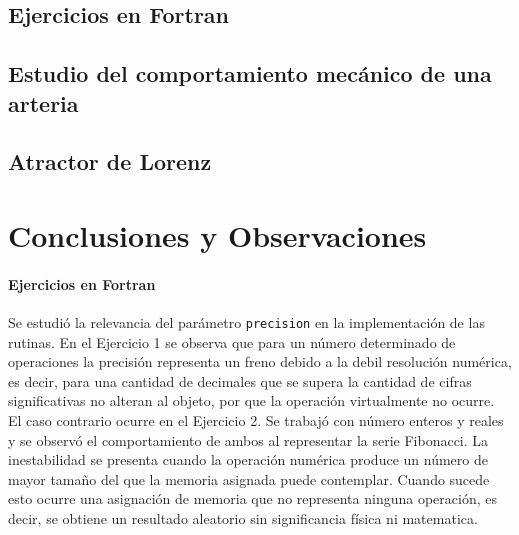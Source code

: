 \documentclass[letterpaper]{article}
\begin{document}

\subsection{Ejercicios en Fortran}



\subsection{Estudio del comportamiento mecánico de una arteria}




\subsection{Atractor de Lorenz}


\newpage

\section{Conclusiones y Observaciones}

\paragraph{Ejercicios en Fortran} Se estudió la relevancia del parámetro \texttt{precision} en la implementación de las rutinas. En el Ejercicio 1 se observa que para un número determinado de operaciones la precisión representa un freno debido a la debil resolución numérica, es decir, para una cantidad de decimales que se supera la cantidad de cifras significativas no alteran al objeto, por que la operación virtualmente no ocurre. \\

El caso contrario ocurre en el Ejercicio 2. Se trabajó con número enteros y reales y se observó el comportamiento de ambos al representar la serie Fibonacci. La inestabilidad se presenta cuando la operación numérica produce un número de mayor tamaño del que la memoria asignada puede contemplar. Cuando sucede esto ocurre una asignación de memoria que no representa ninguna operación, es decir, se obtiene un resultado aleatorio sin significancia física ni matematica. \\
\end{document}
